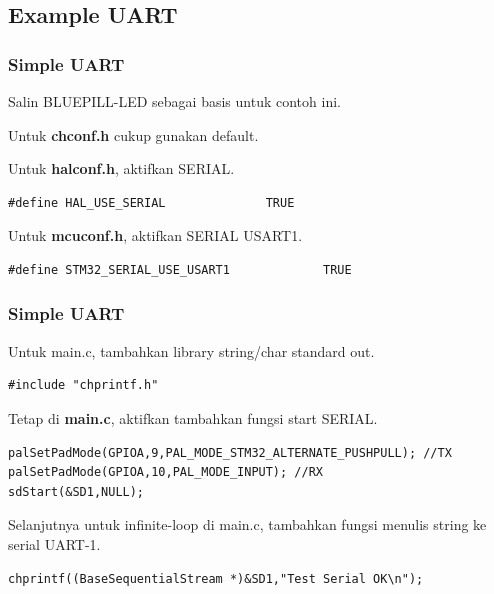 \documentclass[table,dvipsnames]{beamer}
\begin{document}
	\subsection{Example UART}
	\begin{frame}[fragile]
		\frametitle{Simple UART}
		\begin{exampleblock}{}
			Salin BLUEPILL-LED sebagai basis untuk contoh ini.
		\end{exampleblock}

		\begin{exampleblock}{}
			Untuk \textbf{chconf.h} cukup gunakan default.
		\end{exampleblock}

		\begin{exampleblock}{}
			Untuk \textbf{halconf.h}, aktifkan SERIAL.
			\begin{verbatim}
#define HAL_USE_SERIAL              TRUE
			\end{verbatim}
		\end{exampleblock}

		\begin{exampleblock}{}
			Untuk \textbf{mcuconf.h}, aktifkan SERIAL USART1.
			\begin{verbatim}
#define STM32_SERIAL_USE_USART1             TRUE
			\end{verbatim}
		\end{exampleblock}
	\end{frame}

	\begin{frame}[fragile]
		\frametitle{Simple UART}
		\begin{exampleblock}{}
			Untuk main.c, tambahkan library string/char standard out.
			\begin{verbatim}
#include "chprintf.h"
			\end{verbatim}
		\end{exampleblock}

		\begin{exampleblock}{}
			Tetap di \textbf{main.c}, aktifkan tambahkan fungsi start SERIAL.
			\begin{verbatim}
palSetPadMode(GPIOA,9,PAL_MODE_STM32_ALTERNATE_PUSHPULL); //TX
palSetPadMode(GPIOA,10,PAL_MODE_INPUT); //RX
sdStart(&SD1,NULL);
			\end{verbatim}
		\end{exampleblock}

		\begin{exampleblock}{}
			Selanjutnya untuk infinite-loop di main.c, tambahkan fungsi menulis string ke serial UART-1.
			\begin{verbatim}
chprintf((BaseSequentialStream *)&SD1,"Test Serial OK\n");
			\end{verbatim}
		\end{exampleblock}
	\end{frame}
\end{document}
